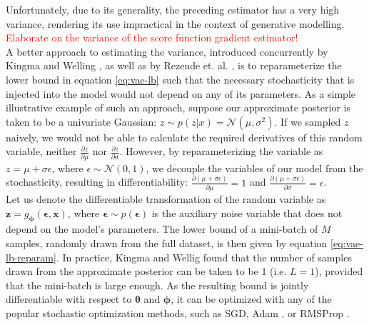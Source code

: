 \documentclass{report}
\newcommand\todo[1]{\textcolor{red}{#1}}
\begin{document}
\noindent Unfortunately, due to its generality, the preceding estimator has a very high variance, rendering its use impractical in the context of generative modelling. \todo{Elaborate on the variance of the score function gradient estimator!}\\

\noindent A better approach to estimating the variance, introduced concurrently by Kingma and Welling \cite{vae}, as well as by Rezende et. al. \cite{rezende14}, is to reparameterize the lower bound in equation \ref{eq:vae-lb} such that the necessary stochasticity that is injected into the model would not depend on any of its parameters. As a simple illustrative example of such an approach, suppose our approximate posterior is taken to be a univariate Gaussian: $z \sim p(z|x) = \mathcal{N}(\mu, \sigma^2)$. If we sampled $z$ naively, we would not be able to calculate the required derivatives of this random variable, neither $\frac{\partial z}{\partial \mu}$ nor $\frac{\partial z}{\partial \sigma}$. However, by reparameterizing the variable as $z = \mu + \sigma \epsilon$, where $\epsilon \sim \mathcal{N}(0, 1)$, we decouple the variables of our model from the stochasticity, resulting in differentiability: $\frac{\partial (\mu + \sigma \epsilon)}{\partial \mu} = 1$ and $\frac{\partial (\mu + \sigma \epsilon)}{\partial \sigma} = \epsilon$. \\

\noindent Let us denote the differentiable transformation of the random variable as $\boldsymbol{z} = g_{\boldsymbol{\phi}}(\boldsymbol{\epsilon}, \boldsymbol{x})$, where $\boldsymbol{\epsilon} \sim p(\boldsymbol{\epsilon})$ is the auxiliary noise variable that does not depend on the model's parameters. The lower bound of a mini-batch of $M$ samples, randomly drawn from the full dataset, is then given by equation \ref{eq:vae-lb-reparam}. In practice, Kingma and Wellig \cite{vae} found that the number of samples drawn from the approximate posterior can be taken to be 1 (i.e. $L=1$), provided that the mini-batch is large enough. As the resulting bound is jointly differentiable with respect to $\boldsymbol{\theta}$ and $\boldsymbol{\phi}$, it can be optimized with any of the popular stochastic optimization methods, such as SGD, Adam \cite{adam}, or RMSProp \cite{rmsprop}.
\end{document}
